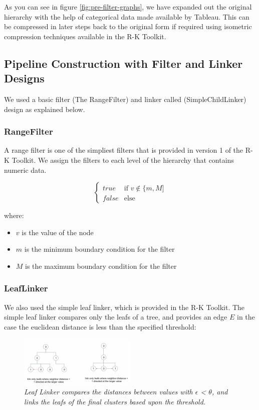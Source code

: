 As you can see in figure \ref{fig:pre-filter-graphs}, we have expanded out the original hierarchy with the help of categorical data made available by Tableau. This can be compressed in later steps back to the original form if required using isometric compression techniques available in the R-K Toolkit.

\subsection{Pipeline Construction with Filter and Linker Designs}

We used a basic filter (The RangeFilter) and linker called (SimpleChildLinker) design as explained below.

\subsubsection{RangeFilter}

A range filter is one of the simpliest filters that is provided in version 1 of the R-K Toolkit. We assign the filters to each level of the hierarchy that contains numeric data.

\[
\begin{cases}
   true  & \text{if } v \notin \lbrace m, M \rbrack\\
   false & \text{else}
\end{cases}
\]

where:

\begin{itemize}
        \item{$v$ is the value of the node}
        \item{$m$ is the minimum boundary condition for the filter}
        \item{$M$ is the maximum boundary condition for the filter}
\end{itemize}

\subsubsection{LeafLinker}

We also used the simple leaf linker, which is provided in the R-K Toolkit. The simple leaf linker compares only the leafs of a tree, and provides an edge $E$ in the case the euclidean distance is less than the specified threshold:

\begin{figure}[h]
	\centering
        \includegraphics[width=0.5\textwidth]{images/linkage.png}
	\caption{\textit{Leaf Linker compares the distances between values with $\epsilon$ < $\theta$, and links the leafs of the final clusters based upon the threshold.}}
	\label{fig:linkage2}
\end{figure}

